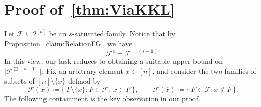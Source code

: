 \documentclass[11pt]{article}
\theoremstyle{definition}
\begin{document}
\section{Proof of~\cref{thm:ViaKKL}}
Let $\mathcal{F}\subseteq 2^{[n]}$ be an $s$-saturated family. Notice that by Proposition~\ref{claim:RelationFG}, we have
\[
  \overline{\mathcal{F}^{c}} = \mathcal{F}^{\Box (s-1)}.
\]
In this view, our task reduces to obtaining
a suitable upper bound on $\bigl|\mathcal{F}^{\Box (s-1)}\bigr|$.
Fix an arbitrary element $x\in [n]$, and consider the two families of subsets of $[n]\setminus\{x\}$ defined by
\[
    \mathcal{F}(x)
    \coloneqq
    \{\,F\setminus\{x\}: F\in\mathcal{F},\, x\in F\,\},
    \qquad
    \mathcal{F}(\overline{x})
    \coloneqq
    \{\,F\in\mathcal{F}: x\notin F\,\}.
\]
The following containment is the key observation in our proof.
\end{document}
